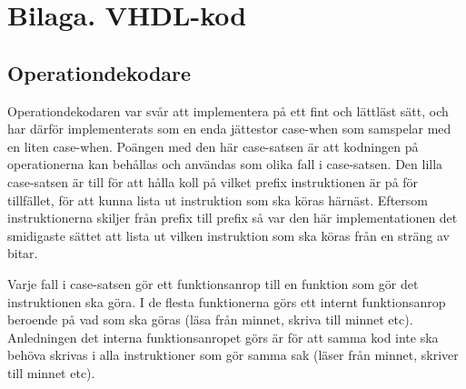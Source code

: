 \documentclass[main.tex]{subfiles}
\begin{document}
\section{Bilaga. VHDL-kod}

\subsection{Operationdekodare}
Operationdekodaren var svår att implementera på ett fint och lättläst sätt,
och har därför implementerats som en enda jättestor case-when som samspelar med
en liten case-when. Poängen med den här case-satsen är att kodningen på
operationerna kan behållas och användas som olika fall i case-satsen. Den lilla
case-satsen är till för att hålla koll på vilket prefix instruktionen är på för
tillfället, för att kunna lista ut instruktion som ska köras härnäst. Eftersom
instruktionerna skiljer från prefix till prefix så var den här implementationen
det smidigaste sättet att lista ut vilken instruktion som ska köras från en
sträng av bitar.

Varje fall i case-satsen gör ett funktionsanrop till en funktion som gör det
instruktionen ska göra. I de flesta funktionerna görs ett internt
funktionsanrop beroende på vad som ska göras (läsa från minnet, skriva till
minnet etc). Anledningen det interna funktionsanropet görs är för att samma kod
inte ska behöva skrivas i alla instruktioner som gör samma sak (läser från minnet,
skriver till minnet etc).
\end{document}
